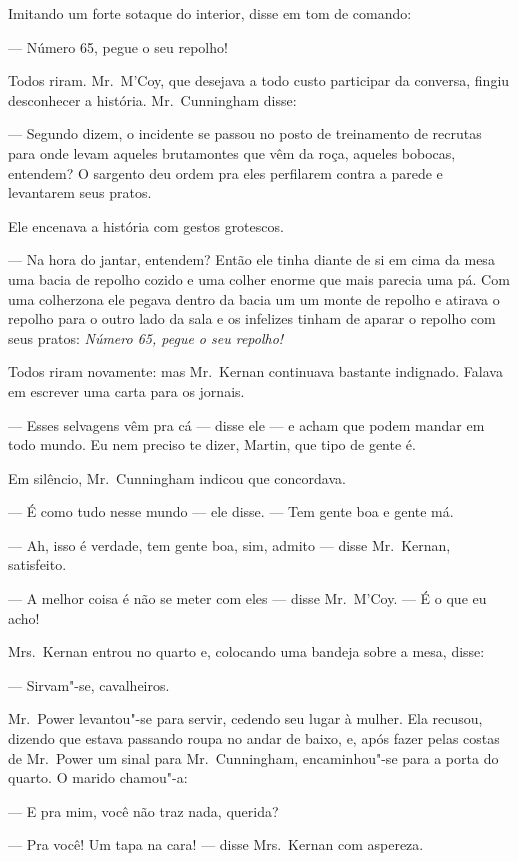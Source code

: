 Imitando um forte sotaque do interior, disse em tom de comando:

--- Número 65, pegue o seu repolho!

Todos riram.  Mr.~M’Coy, que desejava a todo custo participar da conversa,
fingiu desconhecer a história.  Mr.~Cunningham disse:

--- Segundo dizem, o incidente se passou no posto de treinamento de recrutas
para onde levam aqueles brutamontes que vêm da roça, aqueles bobocas, entendem?
O sargento deu ordem pra eles perfilarem contra a parede e levantarem seus
pratos.  

Ele encenava a história com gestos grotescos.

--- Na hora do jantar, entendem?  Então ele tinha diante de si em cima da mesa
uma bacia de repolho cozido e uma colher enorme que mais parecia uma pá.  Com
uma colherzona ele pegava dentro da bacia um um monte de repolho e atirava o
repolho para o outro lado da sala e os infelizes tinham de aparar o repolho com
seus pratos: \textit{Número 65, pegue o seu repolho!}

Todos riram novamente: mas Mr.~Kernan continuava bastante indignado.  Falava em
escrever uma carta para os jornais.

--- Esses selvagens vêm pra cá --- disse ele --- e acham que podem mandar em
todo mundo.  Eu nem preciso te dizer, Martin, que tipo de gente é.

Em silêncio, Mr.~Cunningham indicou que concordava.

--- É como tudo nesse mundo --- ele disse.  --- Tem gente boa e gente má.

--- Ah, isso é verdade, tem gente boa, sim, admito --- disse Mr.~Kernan,
satisfeito.

--- A melhor coisa é não se meter com eles --- disse Mr.~M’Coy. --- É o que eu
acho!

Mrs.~Kernan entrou no quarto e, colocando uma bandeja sobre a mesa, disse:

--- Sirvam"-se, cavalheiros.

Mr.~Power levantou"-se para servir, cedendo seu lugar à mulher.  Ela recusou,
dizendo que estava passando roupa no andar de baixo, e, após fazer pelas costas
de Mr.~Power um sinal para Mr.~Cunningham, encaminhou"-se para a porta do
quarto.  O marido chamou"-a:

--- E pra mim, você não traz nada, querida?

--- Pra você!  Um tapa na cara! --- disse Mrs.~Kernan com aspereza.

